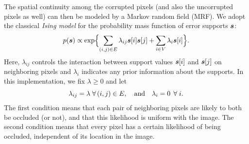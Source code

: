 The spatial continuity among the corrupted pixels (and also the uncorrupted pixels as well) can then be modeled by a Markov random field (MRF). We adopt the classical {\em Ising model} for the probability mass function of error supports $\boldsymbol{s}$:
\begin{equation}
p(\boldsymbol{s}) \propto \exp\Bigl\{\sum_{(i,j)\in
E}\lambda_{ij}\boldsymbol{s}[i]\boldsymbol{s}[j] + \sum_{i\in V}\lambda_i \boldsymbol{s}[i]\Bigr\}.
\label{eqn:ising}
\end{equation}
Here, $\lambda_{ij}$ controls the interaction between support values $\boldsymbol{s}[i]$ and $\boldsymbol{s}[j]$ on neighboring pixels and $\lambda_i$ indicates any prior information about the supports. In this implementation, we fix $\lambda \ge 0$ and let \vspace{0mm}
\begin{displaymath}
{\lambda}_{ij} = \lambda \;\forall\,(i,j) \in E, \quad \mbox{and} \quad \lambda_i = 0 \;\,\forall\;i. \vspace{0mm}
\end{displaymath}
The first condition means that each pair of neighboring pixels are likely to both be occluded (or not), and that
this likelihood is uniform with the image.
The second condition means that every pixel has a certain likelihood of being occluded, independent of its
location in the image.

